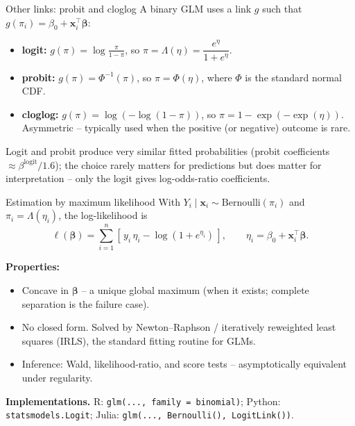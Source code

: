 \documentclass[10pt,ignorenonframetext,aspectratio=169]{beamer}
\newcommand{\bbeta}{\boldsymbol{\beta}}
\begin{document}
\begin{frame}{Other links: probit and cloglog}
A binary GLM uses a link $g$ such that $g(\pi_i) = \beta_0 + \mathbf{x}_i^\top\bbeta$:

\begin{itemize}
    \justifying
    \item \textbf{logit:} $g(\pi) = \log\frac{\pi}{1-\pi}$, so $\pi = \Lambda(\eta) = \dfrac{e^\eta}{1+e^\eta}$.
    \item \textbf{probit:} $g(\pi) = \Phi^{-1}(\pi)$, so $\pi = \Phi(\eta)$, where $\Phi$ is the standard normal CDF.
    \item \textbf{cloglog:} $g(\pi) = \log(-\log(1-\pi))$, so $\pi = 1 - \exp(-\exp(\eta))$. Asymmetric -- typically used when the positive (or negative) outcome is rare.
\end{itemize}

\medskip
Logit and probit produce very similar fitted probabilities (probit coefficients $\approx \beta^{\text{logit}}/1.6$); the choice rarely matters for predictions but does matter for interpretation -- only the logit gives log-odds-ratio coefficients.
\end{frame}


\begin{frame}{Estimation by maximum likelihood}
With $Y_i \mid \mathbf{x}_i \sim \text{Bernoulli}(\pi_i)$ and $\pi_i = \Lambda(\eta_i)$, the log-likelihood is
\[
\ell(\bbeta) = \sum_{i=1}^n \left[\, y_i\, \eta_i - \log(1 + e^{\eta_i}) \,\right], \qquad \eta_i = \beta_0 + \mathbf{x}_i^\top\bbeta.
\]

\medskip
\textbf{Properties:}
\begin{itemize}
    \justifying
    \item Concave in $\bbeta$ -- a unique global maximum (when it exists; complete separation is the failure case).
    \item No closed form. Solved by Newton--Raphson / iteratively reweighted least squares (IRLS), the standard fitting routine for GLMs.
    \item Inference: Wald, likelihood-ratio, and score tests -- asymptotically equivalent under regularity.
\end{itemize}

\medskip
\textbf{Implementations.} R: \texttt{glm(..., family = binomial)}; Python: \texttt{statsmodels.Logit}; Julia: \texttt{glm(..., Bernoulli(), LogitLink())}.
\end{frame}
\end{document}

